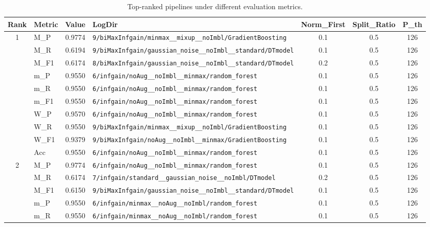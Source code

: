 \begin{table}[htbp]
\caption{Top-ranked pipelines under different evaluation metrics.}
\label{tab:rank_metric_vertical}
\centering
\small
\setlength{\tabcolsep}{4pt}
\begin{tabular}{|c|l|c|>{\ttfamily\footnotesize}p{7.2cm}|c|c|c|}
\hline
Rank & Metric & Value & LogDir & Norm\_First & Split\_Ratio & P\_th \\
\hline
\multirow{10}{*}{1} & M\_P & 0.9774 & \texttt{9/biMaxInfgain/minmax\_\_mixup\_\_noImbl/GradientBoosting} & 0.1 & 0.5  & 126 \\ 
 & M\_R & 0.6194 & \texttt{9/biMaxInfgain/gaussian\_noise\_\_noImbl\_\_standard/DTmodel} & 0.1 & 0.5  & 126 \\ 
 & M\_F1 & 0.6174 & \texttt{8/biMaxInfgain/gaussian\_noise\_\_noImbl\_\_standard/DTmodel} & 0.2 & 0.5  & 126 \\ 
 & m\_P & 0.9550 & \texttt{6/infgain/noAug\_\_noImbl\_\_minmax/random\_forest} & 0.1 & 0.5  & 126 \\ 
 & m\_R & 0.9550 & \texttt{6/infgain/noAug\_\_noImbl\_\_minmax/random\_forest} & 0.1 & 0.5  & 126 \\ 
 & m\_F1 & 0.9550 & \texttt{6/infgain/noAug\_\_noImbl\_\_minmax/random\_forest} & 0.1 & 0.5  & 126 \\ 
 & W\_P & 0.9570 & \texttt{6/infgain/noAug\_\_noImbl\_\_minmax/random\_forest} & 0.1 & 0.5  & 126 \\ 
 & W\_R & 0.9550 & \texttt{9/biMaxInfgain/minmax\_\_mixup\_\_noImbl/GradientBoosting} & 0.1 & 0.5  & 126 \\ 
 & W\_F1 & 0.9379 & \texttt{9/biMaxInfgain/noAug\_\_noImbl\_\_minmax/GradientBoosting} & 0.1 & 0.5  & 126 \\ 
 & Acc & 0.9550 & \texttt{6/infgain/noAug\_\_noImbl\_\_minmax/random\_forest} & 0.1 & 0.5  & 126 \\ 
\hline
\multirow{10}{*}{2} & M\_P & 0.9774 & \texttt{6/infgain/noAug\_\_noImbl\_\_minmax/random\_forest} & 0.1 & 0.5  & 126 \\ 
 & M\_R & 0.6174 & \texttt{7/infgain/standard\_\_gaussian\_noise\_\_noImbl/DTmodel} & 0.2 & 0.5  & 126 \\ 
 & M\_F1 & 0.6150 & \texttt{9/biMaxInfgain/gaussian\_noise\_\_noImbl\_\_standard/DTmodel} & 0.1 & 0.5  & 126 \\ 
 & m\_P & 0.9550 & \texttt{6/infgain/minmax\_\_noAug\_\_noImbl/random\_forest} & 0.1 & 0.5  & 126 \\ 
 & m\_R & 0.9550 & \texttt{6/infgain/minmax\_\_noAug\_\_noImbl/random\_forest} & 0.1 & 0.5  & 126 \\ 

\end{tabular}
\end{table}
